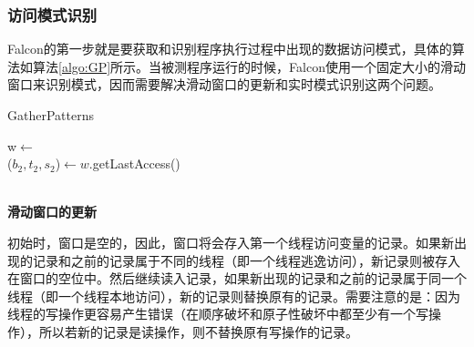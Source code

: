 \subsubsection{访问模式识别}\label{sec:recongnizePattern}
Falcon的第一步就是要获取和识别程序执行过程中出现的数据访问模式，具体的算法如算法\ref{algo:GP}所示。当被测程序运行的时候，Falcon使用一个固定大小的滑动窗口来识别模式，因而需要解决滑动窗口的更新和实时模式识别这两个问题。
\renewcommand{\algorithmcfname}{算法}
  \begin{algorithm}
    \caption{GatherPatterns\label{algo:GP}}
    \DontPrintSemicolon
    \BlankLine
    {
      w$\leftarrow$\\
      ($b_2,t_2,s_2$)$\leftarrow w$.getLastAccess()\\
    }
  \end{algorithm}\\
\textbf{滑动窗口的更新}\par
初始时，窗口是空的，因此，窗口将会存入第一个线程访问变量的记录。如果新出现的记录和之前的记录属于不同的线程（即一个线程逃逸访问），新记录则被存入在窗口的空位中。然后继续读入记录，如果新出现的记录和之前的记录属于同一个线程（即一个线程本地访问），新的记录则替换原有的记录。需要注意的是：因为线程的写操作更容易产生错误（在顺序破坏和原子性破坏中都至少有一个写操作），所以若新的记录是读操作，则不替换原有写操作的记录。\par
